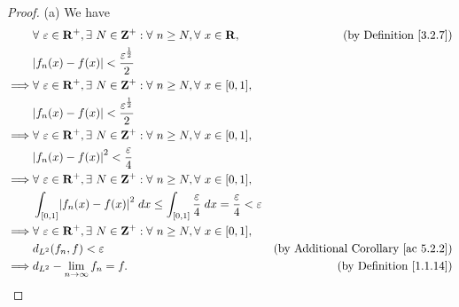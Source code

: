 \begin{proof}{(a)}
    We have
    \begin{align*}
                 & \forall\ \varepsilon \in \mathbf{R}^+, \exists\ N \in \mathbf{Z}^+ : \forall\ n \geq N, \forall\ x \in \mathbf{R},              & \text{(by Definition \ref{3.2.7})}              \\
                 & \abs*{f_n(x) - f(x)} < \frac{\varepsilon^{\frac{1}{2}}}{2}                                                                                                                        \\
        \implies & \forall\ \varepsilon \in \mathbf{R}^+, \exists\ N \in \mathbf{Z}^+ : \forall\ n \geq N, \forall\ x \in [0, 1],                                                                    \\
                 & \abs*{f_n(x) - f(x)} < \frac{\varepsilon^{\frac{1}{2}}}{2}                                                                                                                        \\
        \implies & \forall\ \varepsilon \in \mathbf{R}^+, \exists\ N \in \mathbf{Z}^+ : \forall\ n \geq N, \forall\ x \in [0, 1],                                                                    \\
                 & \abs*{f_n(x) - f(x)}^2 < \frac{\varepsilon}{4}                                                                                                                                    \\
        \implies & \forall\ \varepsilon \in \mathbf{R}^+, \exists\ N \in \mathbf{Z}^+ : \forall\ n \geq N, \forall\ x \in [0, 1],                                                                    \\
                 & \int_{[0, 1]} \abs*{f_n(x) - f(x)}^2 \; dx \leq \int_{[0, 1]} \frac{\varepsilon}{4} \; dx = \frac{\varepsilon}{4} < \varepsilon                                                   \\
        \implies & \forall\ \varepsilon \in \mathbf{R}^+, \exists\ N \in \mathbf{Z}^+ : \forall\ n \geq N, \forall\ x \in [0, 1],                                                                    \\
                 & d_{L^2}(f_n, f) < \varepsilon                                                                                                   & \text{(by Additional Corollary \ref{ac 5.2.2})} \\
        \implies & d_{L^2} - \lim_{n \to \infty} f_n = f.                                                                                          & \text{(by Definition \ref{1.1.14})}
    \end{align*}
\end{proof}

